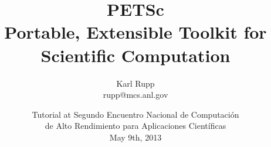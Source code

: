 \documentclass[usepdftitle=false,9pt]{beamer}
\author[Karl Rupp]{Karl Rupp \\ \ttfamily rupp@mcs.anl.gov}
\institute[ANL]
{ \footnotesize
  Mathematics and Computer Science Division \\
  Argonne National Laboratory \\
}
\title[PETSc]{ { \Huge PETSc } \\[0.5em] Portable, Extensible Toolkit for Scientific Computation}
\date[WHPC 2013, May 9th, 2013]{ \footnotesize Tutorial at Segundo Encuentro Nacional de Computación \\ de Alto Rendimiento para Aplicaciones Científicas \\[2em] May 9th, 2013}
\begin{document}
\begin{frame}[plain]
 \frametitle{~}
 \titlepage
\end{frame}


\end{document}
